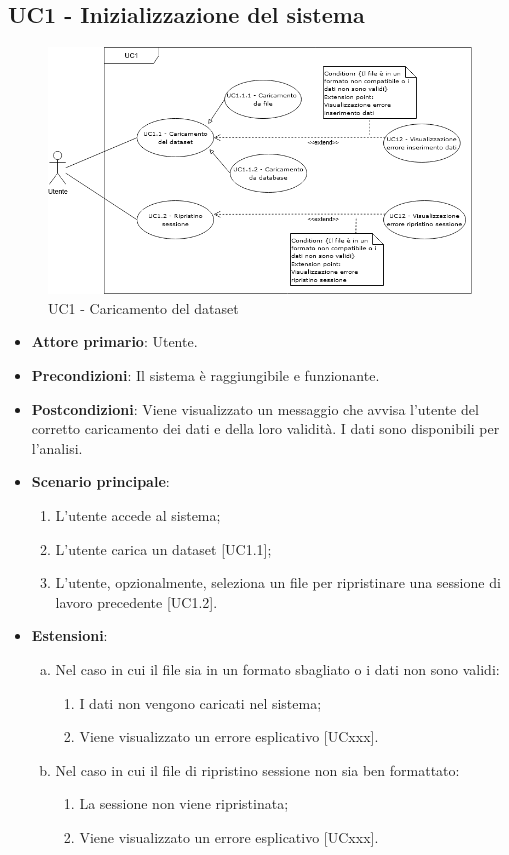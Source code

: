 \subsection{UC1 - Inizializzazione del sistema}
\begin{figure}[h]
\includegraphics[width=\linewidth]{section/Images/UC1.png}
\centering
\caption{UC1 - Caricamento del dataset}
\end{figure}
\begin{itemize}
	\item \textbf{Attore primario}: Utente.
	\item \textbf{Precondizioni}: Il sistema è raggiungibile e funzionante.
	\item \textbf{Postcondizioni}: Viene visualizzato un messaggio che avvisa l'utente del corretto caricamento dei dati e della loro validità. I dati sono disponibili per l'analisi.
	\item \textbf{Scenario principale}:
		\begin{enumerate}
			\item L'utente accede al sistema;
			\item L'utente carica un dataset [UC1.1];
			\item L'utente, opzionalmente, seleziona un file per ripristinare una sessione di lavoro precedente [UC1.2].
			
		\end{enumerate}
	\item \textbf{Estensioni}:
	\begin{enumerate}[(a)]
		\item Nel caso in cui il file sia in un formato sbagliato o i dati non sono validi:
		\begin{enumerate}[1.]
			\item I dati non vengono caricati nel sistema;
			\item Viene visualizzato un errore esplicativo [UCxxx].
		\end{enumerate}
		
		\item Nel caso in cui il file di ripristino sessione non sia ben formattato:
		\begin{enumerate}[1.]
			\item La sessione non viene ripristinata;
			\item Viene visualizzato un errore esplicativo [UCxxx].
		\end{enumerate}
	\end{enumerate}
\end{itemize}






  